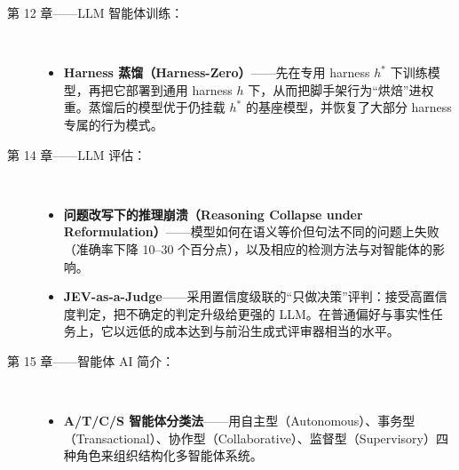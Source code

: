 \documentclass[11pt,a4paper,openany]{book}
\begin{document}
\begin{description}
  \item[第 12 章——LLM 智能体训练：]~
    \begin{itemize}
      \item \textbf{Harness 蒸馏（Harness-Zero）}——先在专用 harness $h^*$ 下训练模型，再把它部署到通用 harness $h$ 下，从而把脚手架行为“烘焙”进权重。蒸馏后的模型优于仍挂载 $h^*$ 的基座模型，并恢复了大部分 harness 专属的行为模式。
    \end{itemize}

  \item[第 14 章——LLM 评估：]~
    \begin{itemize}
      \item \textbf{问题改写下的推理崩溃（Reasoning Collapse under Reformulation）}——模型如何在语义等价但句法不同的问题上失败（准确率下降 10--30 个百分点），以及相应的检测方法与对智能体的影响。
      \item \textbf{JEV-as-a-Judge}——采用置信度级联的“只做决策”评判：接受高置信度判定，把不确定的判定升级给更强的 LLM。在普通偏好与事实性任务上，它以远低的成本达到与前沿生成式评审器相当的水平。
    \end{itemize}

  \item[第 15 章——智能体 AI 简介：]~
    \begin{itemize}
      \item \textbf{A/T/C/S 智能体分类法}——用自主型（Autonomous）、事务型（Transactional）、协作型（Collaborative）、监督型（Supervisory）四种角色来组织结构化多智能体系统。
    \end{itemize}


\end{description}
\end{document}
